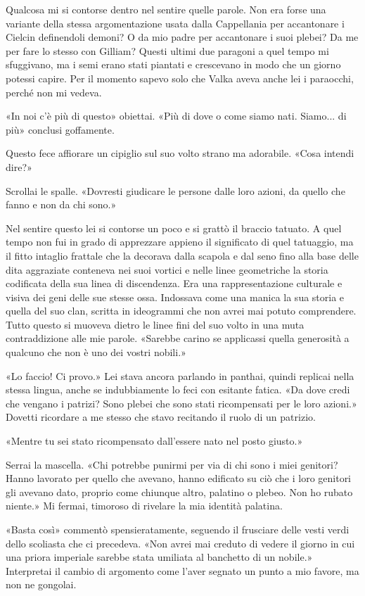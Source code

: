 Qualcosa mi si contorse dentro nel sentire quelle parole. Non era forse
una variante della stessa argomentazione usata dalla Cappellania per
accantonare i Cielcin definendoli demoni? O da mio padre per accantonare
i suoi plebei? Da me per fare lo stesso con Gilliam? Questi ultimi due
paragoni a quel tempo mi sfuggivano, ma i semi erano stati piantati e
crescevano in modo che un giorno potessi capire. Per il momento sapevo
solo che Valka aveva anche lei i paraocchi, perché non mi vedeva.

«In noi c'è più di questo» obiettai. «Più di dove o come siamo nati.
Siamo... di più» conclusi goffamente.

Questo fece affiorare un cipiglio sul suo volto strano ma adorabile.
«Cosa intendi dire?»

Scrollai le spalle. «Dovresti giudicare le persone dalle loro azioni, da
quello che fanno e non da chi sono.»

Nel sentire questo lei si contorse un poco e si grattò il braccio
tatuato. A quel tempo non fui in grado di apprezzare appieno il
significato di quel tatuaggio, ma il fitto intaglio frattale che la
decorava dalla scapola e dal seno fino alla base delle dita aggraziate
conteneva nei suoi vortici e nelle linee geometriche la storia
codificata della sua linea di discendenza. Era una rappresentazione
culturale e visiva dei geni delle sue stesse ossa. Indossava come una
manica la sua storia e quella del suo clan, scritta in ideogrammi che
non avrei mai potuto comprendere. Tutto questo si muoveva dietro le
linee fini del suo volto in una muta contraddizione alle mie parole.
«Sarebbe carino se applicassi quella generosità a qualcuno che non è uno
dei vostri nobili.»

«Lo faccio! Ci provo.» Lei stava ancora parlando in panthai, quindi
replicai nella stessa lingua, anche se indubbiamente lo feci con
esitante fatica. «Da dove credi che vengano i patrizi? Sono plebei che
sono stati ricompensati per le loro azioni.» Dovetti ricordare a me
stesso che stavo recitando il ruolo di un patrizio.

«Mentre tu sei stato ricompensato dall'essere nato nel posto giusto.»

Serrai la mascella. «Chi potrebbe punirmi per via di chi sono i miei
genitori? Hanno lavorato per quello che avevano, hanno edificato su ciò
che i loro genitori gli avevano dato, proprio come chiunque altro,
palatino o plebeo. Non ho rubato niente.» Mi fermai, timoroso di
rivelare la mia identità palatina.

«Basta così» commentò spensieratamente, seguendo il frusciare delle
vesti verdi dello scoliasta che ci precedeva. «Non avrei mai creduto di
vedere il giorno in cui una priora imperiale sarebbe stata umiliata al
banchetto di un nobile.» Interpretai il cambio di argomento come l'aver
segnato un punto a mio favore, ma non ne gongolai.

